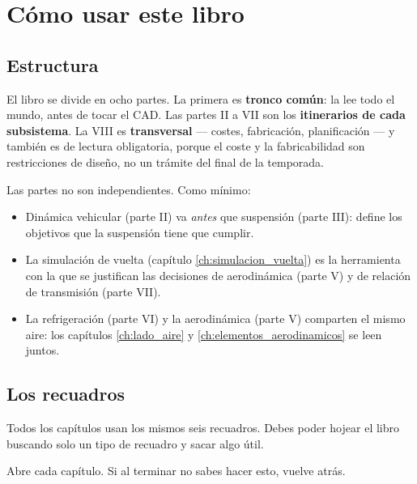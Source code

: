 \chapter*{Cómo usar este libro}

\section*{Estructura}

El libro se divide en ocho partes. La primera es \textbf{tronco común}: la lee
todo el mundo, antes de tocar el CAD.
Las partes II a VII son los \textbf{itinerarios de cada subsistema}. La VIII es
\textbf{transversal} --- costes, fabricación, planificación --- y también es de
lectura obligatoria, porque el coste y la fabricabilidad son restricciones de
diseño, no un trámite del final de la temporada.

Las partes no son independientes. Como mínimo:

\begin{itemize}
  \item Dinámica vehicular (parte II) va \emph{antes} que suspensión (parte III):
        define los objetivos que la suspensión tiene que cumplir.
  \item La simulación de vuelta (capítulo \ref{ch:simulacion_vuelta}) es la
        herramienta con la que se justifican las decisiones de aerodinámica
        (parte V) y de relación de transmisión (parte VII).
  \item La refrigeración (parte VI) y la aerodinámica (parte V) comparten el
        mismo aire: los capítulos \ref{ch:lado_aire} y
        \ref{ch:elementos_aerodinamicos} se leen juntos.
\end{itemize}

\section*{Los recuadros}

Todos los capítulos usan los mismos seis recuadros. Debes poder hojear el libro
buscando solo un tipo de recuadro y sacar algo útil.

\begin{objetivos}
  \item Abre cada capítulo. Si al terminar no sabes hacer esto, vuelve atrás.
\end{objetivos}

